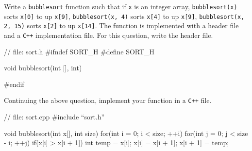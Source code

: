 

\nextq
Write a \verb!bubblesort! function such that if \verb!x! is an
integer array,
\verb!bubblesort(x)! sorts \verb!x[0]! to up \verb!x[9]!,
\verb!bubblesort(x, 4)! sorts \verb!x[4]! to up \verb!x[9]!,
\verb!bubblesort(x, 2, 15)! sorts \verb!x[2]! to up \verb!x[14]!.
The function is implemented with a header file and a \texttt{C++}
implementation file.
For this question, write the header file.
\\
\ANSWER
\begin{answercode}
// file: sort.h
#ifndef SORT_H
#define SORT_H

void bubblesort(int [], int)

#endif
\end{answercode}

\nextq
Continuing the above question, implement your function in a \texttt{C++}
file.
\\
\ANSWER
\begin{answercode}
// file: sort.cpp
#include ``sort.h''

void bubblesort(int x[], int size)
{
  for(int i = 0; i < size; ++i)
  {
    for(int j = 0; j < size - i; ++j)
    {
      if(x[i] > x[i + 1])
      {
        int temp = x[i];
        x[i] = x[i + 1];
        x[i + 1] = temp;
      }
    }
  }
}
\end{answercode}


